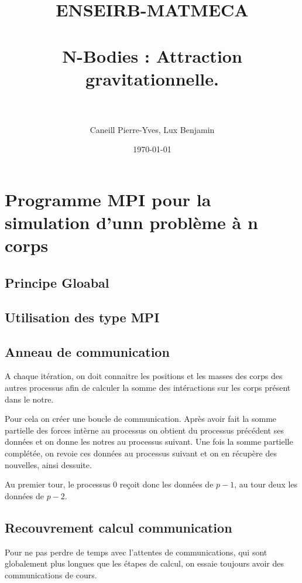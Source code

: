 \documentclass[paper=a4, fontsize=11pt]{scrartcl} %
\title{	
\normalfont \normalsize 
\textsc{ENSEIRB-MATMECA} \\ [25pt] %
\horrule{0.5pt} \\[0.4cm] %
\huge N-Bodies : Attraction gravitationnelle. \\ %
\horrule{2pt} \\[0.5cm] %
}
\author{Caneill Pierre-Yves, Lux Benjamin} %
\date{\normalsize\today} %
\numberwithin{equation}{section} %
\numberwithin{figure}{section} %
\numberwithin{table}{section} %
\begin{document}
\maketitle %


\section{Programme MPI pour la simulation d'unn problème à n corps}



\subsection{Principe Gloabal}

\subsection{Utilisation des type MPI}

\subsection{Anneau de communication}
A chaque itération, on doit connaitre les positions et les masses des
corps des autres processus afin de calculer la somme des intéractions
sur les corps présent dans le notre.

Pour cela on créer une boucle de communication. Après avoir fait la
somme partielle des forces intèrne au processus on obtient du
processus précédent ses données et on donne les notres au processus
suivant. Une fois la somme partielle complétée, on revoie ces données
au processus suivant et on en récupère des nouvelles, ainsi dessuite.

Au premier tour, le processus $0$ reçoit donc les données de $p-1$, au
tour deux les données de $p-2$.



\subsection{Recouvrement calcul communication}
Pour ne pas perdre de temps avec l'attentes de communications, qui
sont globalement plus longues que les étapes de calcul, on essaie
toujours avoir des communications de cours.
\end{document}
